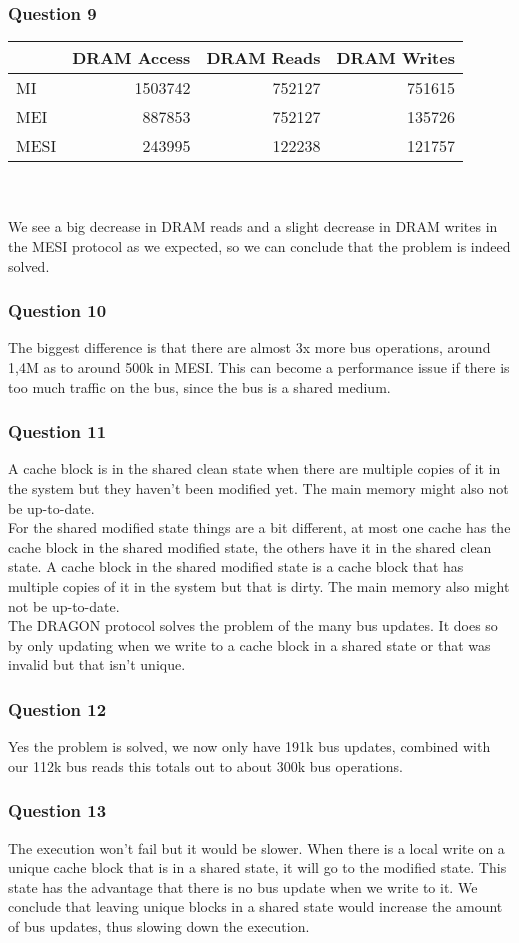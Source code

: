 \documentclass[12pt,a4paper,oneside]{article}
\begin{document}
\subsubsection*{Question 9}
\begin{tabular}{| l | r | r | r |}
\hline
&DRAM Access & DRAM Reads & DRAM Writes\\
\hline
MI & 1503742 & 752127 & 751615\\
\hline
MEI &  887853& 752127 & 135726\\
\hline
MESI & 243995 & 122238 & 121757\\
\hline
\end{tabular}\\\\
We see a big decrease in DRAM reads and a slight decrease in DRAM writes in the MESI protocol as we expected, so we can conclude that the problem is indeed solved. 

\subsubsection*{Question 10}
The biggest difference is that there are almost 3x more bus operations, around 1,4M as to around 500k in MESI. This can become a performance issue if there is too much traffic on the bus, since the bus is a shared medium.

\subsubsection*{Question 11}
A cache block is in the shared clean state when there are multiple copies of it in the system but they haven't been modified yet. The main memory might also not be up-to-date.\\
For the shared modified state things are a bit different, at most one cache has the cache block in the shared modified state, the others have it in the shared clean state. A cache block in the shared modified state is a cache block that has multiple copies of it in the system but that is dirty. The main memory also might not be up-to-date.\\
The DRAGON protocol solves the problem of the many bus updates. It does so by only updating when we write to a cache block in a shared state or that was invalid but that isn't unique.

\subsubsection*{Question 12}
Yes the problem is solved, we now only have 191k bus updates, combined with our 112k bus reads this totals out to about 300k bus operations.

\subsubsection*{Question 13}
The execution won't fail but it would be slower. When there is a local write on a unique cache block that is in a shared state, it will go to the modified state. This state has the advantage that there is no bus update when we write to it. We conclude that leaving unique blocks in a shared state would increase the amount of bus updates, thus slowing down the execution.
\end{document}
